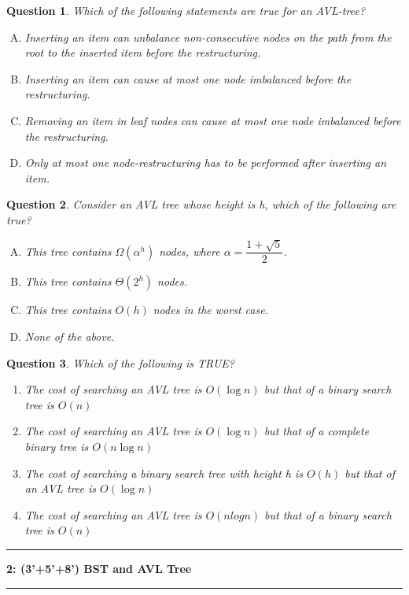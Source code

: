 \documentclass[10.5pt]{article}
\newcommand\question[2]{\vspace{.25in}\hrule\textbf{#1: #2}\vspace{.5em}\hrule\vspace{.10in}}
\newtheorem{Q}{Question}
\begin{document}
\begin{Q}
    Which of the following statements are true for an AVL-tree?
	\begin{enumerate}[(A)]
		\item Inserting an item can unbalance non-consecutive nodes on the path from the root to the inserted item before the restructuring.
		\item Inserting an item can cause at most one node imbalanced before the restructuring.
		\item Removing an item in leaf nodes can cause at most one node imbalanced before the restructuring.
		\item Only at most one node-restructuring has to be performed after inserting an item.
	\end{enumerate}
\end{Q}

\begin{Q}
	Consider an AVL tree whose height is h, which of the following are true?
	\begin{enumerate}[(A)]
		\item This tree contains $\Omega(\alpha^h)$ nodes, where $\alpha = \dfrac{1+\sqrt{5}}{2}$.
		\item This tree contains $\Theta(2^h)$ nodes.
		\item This tree contains $O(h)$ nodes in the worst case.
		\item None of the above.
	\end{enumerate}
\end{Q}


\begin{Q}
Which of the following is TRUE?
    \begin{enumerate}
        \item[(A)] The cost of searching an AVL tree is $O(\log n)$ but that of a binary search tree is $O(n)$
        \item[(B)] The cost of searching an AVL tree is $O(\log n)$ but that of a complete binary tree is $O(n \log n)$
        \item[(C)] The cost of searching a binary search tree with height h is $O(h)$ but that of an AVL tree is $O(\log n)$
        \item[(D)] The cost of searching an AVL tree is $O(n log n)$ but that of a binary search tree is $O(n)$
    \end{enumerate}
\end{Q}

\newpage
\question{2}{(3'+5'+8') BST and AVL Tree}
\end{document}

